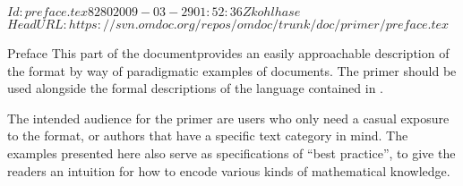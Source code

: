 \svnInfo $Id: preface.tex 8280 2009-03-29 01:52:36Z kohlhase $
\svnKeyword $HeadURL: https://svn.omdoc.org/repos/omdoc/trunk/doc/primer/preface.tex $

\begin{omgroup}[id=preface,display=flow]{Preface}
  This \ifbook part of the {\report}\else document\fi provides an easily approachable
  description of the {\omdoc} format by way of paradigmatic examples of {\omdoc}
  documents.  The primer should be used alongside the formal descriptions of the language
  contained in {}.

  The intended audience for the primer are users who only need a casual exposure to the
  format, or authors that have a specific text category in mind.  The examples presented
  here also serve as specifications of ``best practice'', to give the readers an intuition
  for how to encode various kinds of mathematical knowledge.
\end{omgroup}


